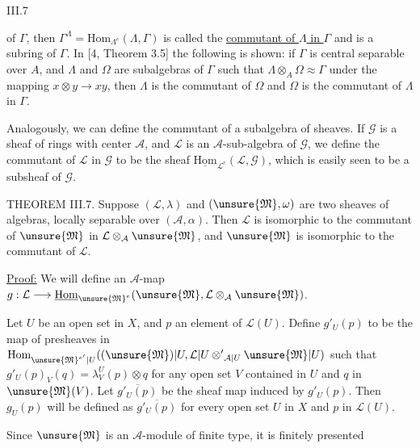 III.7

of $\Gamma$, then $\Gamma^\Lambda=\mathrm{Hom}_{\Lambda^e}(\Lambda,\Gamma)$ is called the \uline{commutant of $\Lambda$ in $\Gamma$} and is a subring of $\Gamma$. In [4, Theorem 3.5] the following is shown: if $\Gamma$ is central separable over $A$, and $\Lambda$ and $\Omega$ are subalgebras of $\Gamma$ such that $\Lambda\otimes_A\Omega\approx\Gamma$ under the mapping $x\otimes y\longrightarrow xy$, then $\Lambda$ is the commutant of $\Omega$ and $\Omega$ is the commutant of $\Lambda$ in $\Gamma$.

Analogously, we can define the commutant of a subalgebra of sheaves. If $\mathcal{G}$ is a sheaf of rings with center $\mathcal{A}$, and $\mathcal{L}$ is an $\mathcal{A}$-sub-algebra of $\mathcal{G}$, we define the commutant of $\mathcal{L}$ in $\mathcal{G}$ to be the sheaf $\underline{\mathrm{Hom}}_{\mathcal{L}^e}(\mathcal{L},\mathcal{G})$, which is easily seen to be a subsheaf of $\mathcal{G}$.


THEOREM III.7. Suppose $(\mathcal{L},\lambda)$ and $(\unsure{\mathfrak{M}},\omega)$ are two sheaves of algebras, locally separable over $(\mathcal{A},\alpha)$. Then $\mathcal{L}$ is isomorphic to the commutant of $\unsure{\mathfrak{M}}$ in $\mathcal{L}\otimes_{\mathcal{A}}\unsure{\mathfrak{M}}$, and $\unsure{\mathfrak{M}}$ is isomorphic to the commutant of $\mathcal{L}$.

\uline{Proof:} We will define an $\mathcal{A}$-map $g:\mathcal{L}\longrightarrow\underline{\mathrm{Hom}}_{\unsure{\mathfrak{M}}^e}(\unsure{\mathfrak{M}},\mathcal{L}\otimes_{\mathcal{A}}\unsure{\mathfrak{M}})$.

Let $U$ be an open set in $X$, and $p$ an element of $\mathcal{L}(U)$. Define $g'_U(p)$ to be the map of presheaves in $\mathrm{Hom}_{\unsure{\mathfrak{M}}^{e'}|U}((\unsure{\mathfrak{M}})|U,\mathcal{L}|U\mathbin{\otimes'}_{\mathcal{A}|U}\unsure{\mathfrak{M}}|U)$ such that $g'_U(p)_V(q)=\lambda^U_V(p)\otimes q$ for any open set $V$ contained in $U$ and $q$ in $\unsure{\mathfrak{M}}(V)$. Let $\overline{g'_U(p)}$ be the sheaf map induced by $g'_U(p)$. Then $g_U(p)$ will be defined as $\overline{g'_U(p)}$ for every open set $U$ in $X$ and $p$ in $\mathcal{L}(U)$.

Since $\unsure{\mathfrak{M}}$ is an $\mathcal{A}$-module of finite type, it is finitely presented




